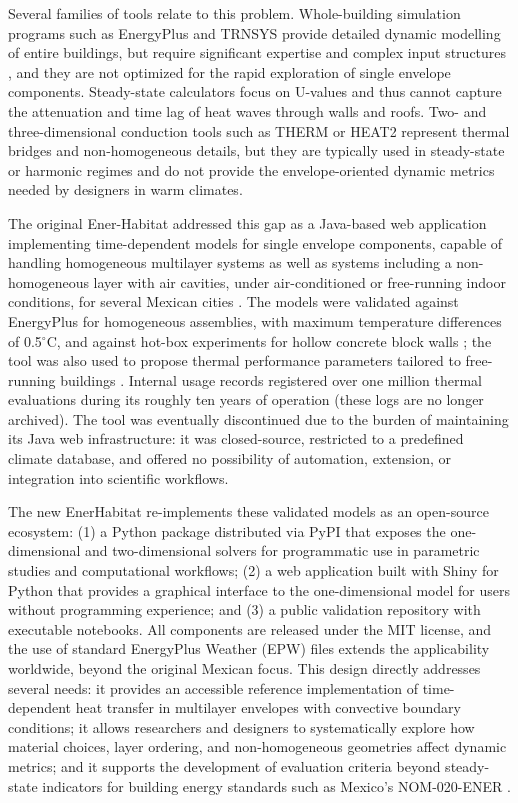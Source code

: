 \documentclass[preprint,12pt, a4paper]{elsarticle}
\begin{document}
Several families of tools relate to this problem. Whole-building simulation programs such as EnergyPlus \cite{energyplus} and TRNSYS provide detailed dynamic modelling of entire buildings, but require significant expertise and complex input structures \cite{crawley2008contrasting}, and they are not optimized for the rapid exploration of single envelope components. Steady-state calculators focus on U-values and thus cannot capture the attenuation and time lag of heat waves through walls and roofs. Two- and three-dimensional conduction tools such as THERM or HEAT2 represent thermal bridges and non-homogeneous details, but they are typically used in steady-state or harmonic regimes and do not provide the envelope-oriented dynamic metrics needed by designers in warm climates.

The original Ener-Habitat addressed this gap as a Java-based web application implementing time-dependent models for single envelope components, capable of handling homogeneous multilayer systems as well as systems including a non-homogeneous layer with air cavities, under air-conditioned or free-running indoor conditions, for several Mexican cities \cite{barrios2016enerhabitat}. The models were validated against EnergyPlus for homogeneous assemblies, with maximum temperature differences of 0.5$^\circ$C, and against hot-box experiments for hollow concrete block walls \cite{barrios2016enerhabitat}; the tool was also used to propose thermal performance parameters tailored to free-running buildings \cite{barrios2011wall,barrios2012envelope}. Internal usage records registered over one million thermal evaluations during its roughly ten years of operation (these logs are no longer archived). The tool was eventually discontinued due to the burden of maintaining its Java web infrastructure: it was closed-source, restricted to a predefined climate database, and offered no possibility of automation, extension, or integration into scientific workflows.

The new EnerHabitat re-implements these validated models as an open-source ecosystem: (1) a Python package distributed via PyPI that exposes the one-dimensional and two-dimensional solvers for programmatic use in parametric studies and computational workflows; (2) a web application built with Shiny for Python that provides a graphical interface to the one-dimensional model for users without programming experience; and (3) a public validation repository with executable notebooks. All components are released under the MIT license, and the use of standard EnergyPlus Weather (EPW) files extends the applicability worldwide, beyond the original Mexican focus. This design directly addresses several needs: it provides an accessible reference implementation of time-dependent heat transfer in multilayer envelopes with convective boundary conditions; it allows researchers and designers to systematically explore how material choices, layer ordering, and non-homogeneous geometries affect dynamic metrics; and it supports the development of evaluation criteria beyond steady-state indicators for building energy standards such as Mexico's NOM-020-ENER \cite{nom020ener}.
\end{document}
